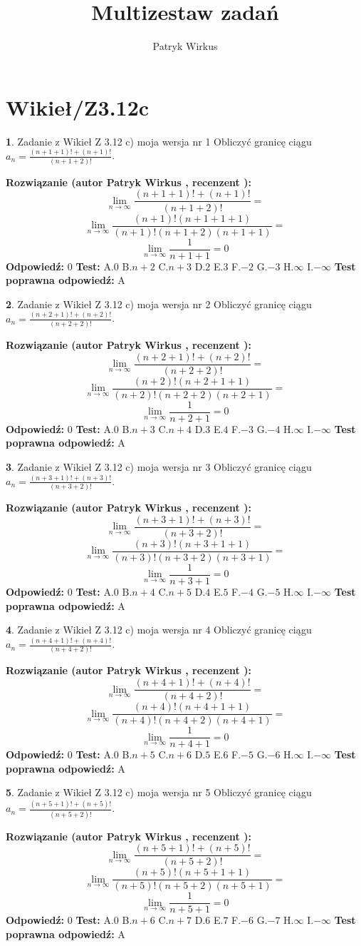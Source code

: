 \documentclass[12pt, a4paper]{article}
\title{Multizestaw zadań}
\author{Patryk Wirkus}
\date{}
\theoremstyle{definition} %
\newtheorem{zad}{}
\newcommand{\kategoria}[1]{\section{#1}}
\newcommand{\zadStart}[1]{\begin{zad}#1\newline}
\newcommand{\zadStop}{\end{zad}}
\newcommand{\rozwStart}[2]{\noindent \textbf{Rozwiązanie (autor #1 , recenzent #2): }\newline}
\newcommand{\rozwStop}{\newline}
\newcommand{\odpStart}{\noindent \textbf{Odpowiedź:}\newline}
\newcommand{\odpStop}{\newline}
\newcommand{\testStart}{\noindent \textbf{Test:}\newline}
\newcommand{\testStop}{\newline}
\newcommand{\kluczStart}{\noindent \textbf{Test poprawna odpowiedź:}\newline}
\newcommand{\kluczStop}{\newline}
\begin{document}
\maketitle

\kategoria{Wikieł/Z3.12c}


\zadStart{Zadanie z Wikieł Z 3.12 c) moja wersja nr 1}
Obliczyć granicę ciągu $a_{n}=\frac{(n+1+1)!+(n+1)!}{(n+1+2)!}$.
\zadStop
\rozwStart{Patryk Wirkus}{}
$$\lim\limits_{n\to\infty}\frac{(n+1+1)!+(n+1)!}{(n+1+2)!}=$$
$$\lim\limits_{n\to\infty}\frac{(n+1)!(n+1+1+1)}{(n+1)!(n+1+2)(n+1+1)}=$$
$$\lim\limits_{n\to\infty}\frac{1}{n+1+1}= 0$$
\rozwStop
\odpStart
$0$
\odpStop
\testStart
A.$0$
B.$n+2$
C.$n+3$
D.$2$
E.$3$
F.$-2$
G.$-3$
H.$\infty$
I.$-\infty$
\testStop
\kluczStart
A
\kluczStop



\zadStart{Zadanie z Wikieł Z 3.12 c) moja wersja nr 2}
Obliczyć granicę ciągu $a_{n}=\frac{(n+2+1)!+(n+2)!}{(n+2+2)!}$.
\zadStop
\rozwStart{Patryk Wirkus}{}
$$\lim\limits_{n\to\infty}\frac{(n+2+1)!+(n+2)!}{(n+2+2)!}=$$
$$\lim\limits_{n\to\infty}\frac{(n+2)!(n+2+1+1)}{(n+2)!(n+2+2)(n+2+1)}=$$
$$\lim\limits_{n\to\infty}\frac{1}{n+2+1}= 0$$
\rozwStop
\odpStart
$0$
\odpStop
\testStart
A.$0$
B.$n+3$
C.$n+4$
D.$3$
E.$4$
F.$-3$
G.$-4$
H.$\infty$
I.$-\infty$
\testStop
\kluczStart
A
\kluczStop



\zadStart{Zadanie z Wikieł Z 3.12 c) moja wersja nr 3}
Obliczyć granicę ciągu $a_{n}=\frac{(n+3+1)!+(n+3)!}{(n+3+2)!}$.
\zadStop
\rozwStart{Patryk Wirkus}{}
$$\lim\limits_{n\to\infty}\frac{(n+3+1)!+(n+3)!}{(n+3+2)!}=$$
$$\lim\limits_{n\to\infty}\frac{(n+3)!(n+3+1+1)}{(n+3)!(n+3+2)(n+3+1)}=$$
$$\lim\limits_{n\to\infty}\frac{1}{n+3+1}= 0$$
\rozwStop
\odpStart
$0$
\odpStop
\testStart
A.$0$
B.$n+4$
C.$n+5$
D.$4$
E.$5$
F.$-4$
G.$-5$
H.$\infty$
I.$-\infty$
\testStop
\kluczStart
A
\kluczStop



\zadStart{Zadanie z Wikieł Z 3.12 c) moja wersja nr 4}
Obliczyć granicę ciągu $a_{n}=\frac{(n+4+1)!+(n+4)!}{(n+4+2)!}$.
\zadStop
\rozwStart{Patryk Wirkus}{}
$$\lim\limits_{n\to\infty}\frac{(n+4+1)!+(n+4)!}{(n+4+2)!}=$$
$$\lim\limits_{n\to\infty}\frac{(n+4)!(n+4+1+1)}{(n+4)!(n+4+2)(n+4+1)}=$$
$$\lim\limits_{n\to\infty}\frac{1}{n+4+1}= 0$$
\rozwStop
\odpStart
$0$
\odpStop
\testStart
A.$0$
B.$n+5$
C.$n+6$
D.$5$
E.$6$
F.$-5$
G.$-6$
H.$\infty$
I.$-\infty$
\testStop
\kluczStart
A
\kluczStop



\zadStart{Zadanie z Wikieł Z 3.12 c) moja wersja nr 5}
Obliczyć granicę ciągu $a_{n}=\frac{(n+5+1)!+(n+5)!}{(n+5+2)!}$.
\zadStop
\rozwStart{Patryk Wirkus}{}
$$\lim\limits_{n\to\infty}\frac{(n+5+1)!+(n+5)!}{(n+5+2)!}=$$
$$\lim\limits_{n\to\infty}\frac{(n+5)!(n+5+1+1)}{(n+5)!(n+5+2)(n+5+1)}=$$
$$\lim\limits_{n\to\infty}\frac{1}{n+5+1}= 0$$
\rozwStop
\odpStart
$0$
\odpStop
\testStart
A.$0$
B.$n+6$
C.$n+7$
D.$6$
E.$7$
F.$-6$
G.$-7$
H.$\infty$
I.$-\infty$
\testStop
\kluczStart
A
\kluczStop
\end{document}
